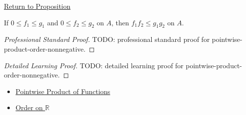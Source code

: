 \newpage
{}
\label{prf:pointwise-product-order-nonnegative}

\begin{remark*}[Return]
\hyperref[prop:pointwise-product-order-nonnegative]{Return to Proposition}
\end{remark*}

\begin{proposition*}
If \(0\leq f_1\leq g_1\) and \(0\leq f_2\leq g_2\) on \(A\), then
\(f_1f_2\leq g_1g_2\) on \(A\).
\end{proposition*}

\begin{proof}[Professional Standard Proof]
\LRAProofBodyStart
TODO: professional standard proof for pointwise-product-order-nonnegative.
\end{proof}

\begin{proof}[Detailed Learning Proof]
\LRAProofBodyStart
TODO: detailed learning proof for pointwise-product-order-nonnegative.
\end{proof}

\begin{remark*}
\end{remark*}

\begin{dependencies}
\begin{itemize}
  \item \hyperref[def:pointwise-product-of-functions]{Pointwise Product of Functions}
  \item \hyperref[def:order-on-r]{Order on \(\mathbb{R}\)}
\end{itemize}
\end{dependencies}

\clearpage

